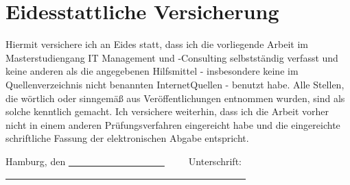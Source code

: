 \chapter*{Eidesstattliche Versicherung}
\thispagestyle{empty}

Hiermit versichere ich an Eides statt, dass ich die vorliegende Arbeit im Masterstudiengang IT Management und -Consulting selbstständig verfasst und keine anderen als die angegebenen Hilfsmittel - insbesondere keine im Quellenverzeichnis nicht benannten InternetQuellen - benutzt habe. 
Alle Stellen, die wörtlich oder sinngemäß aus Veröffentlichungen entnommen wurden, sind als solche kenntlich gemacht.
Ich versichere weiterhin, dass ich die Arbeit vorher nicht in einem anderen Prüfungsverfahren eingereicht habe und die eingereichte schriftliche Fassung der elektronischen Abgabe entspricht.


\vspace{2cm} 

\noindent Hamburg, den \uline{~~~~~~~~~~~~~~~~~~~~}~~~~~Unterschrift: \uline{~~~~~~~~~~~~~~~~~~~~~~~~~~~~~~~~~~~~~~~~~~~~~~~~~~} 
